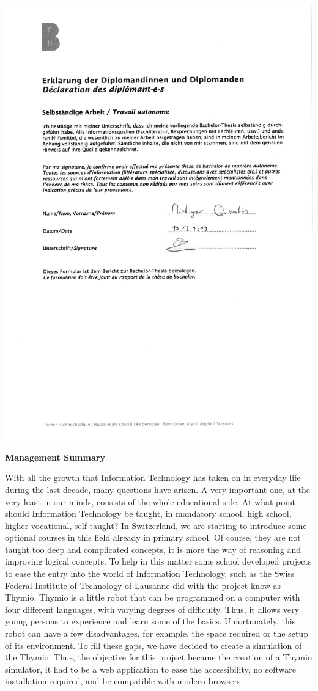 \documentclass{scrbook}
\begin{document}
\includegraphics[width=\textwidth]{pdf/Declaration_of_authonomy.pdf}
\clearpage

\textbf{\large{Management Summary}}


With all the growth that Information Technology has taken on in everyday life during the last decade, many questions have arisen. A very important one, at the very least in our minds, consists of the whole educational side. 
At what point should Information Technology be taught, in mandatory school, high school, higher vocational, self-taught? In Switzerland, we are starting to introduce some optional courses in this field already in primary school. 
Of course, they are not taught too deep and complicated concepts, it is more the way of reasoning and improving logical concepts. To help in this matter some school developed projects to ease the entry into the world of Information Technology, 
such as the Swiss Federal Institute of Technology of Lausanne did with the project know as Thymio. Thymio is a little robot that can be programmed on a computer with four different languages, with varying degrees of difficulty. 
Thus, it allows very young persons to experience and learn some of the basics. Unfortunately, this robot can have a few disadvantages, for example, the space required or the setup of its environment. 
To fill these gaps, we have decided to create a simulation of the Thymio.
Thus, the objective for this project became the creation of a Thymio simulator, it had to be a web application to ease the accessibility, no software installation required, and be compatible with modern browsers.
\end{document}
